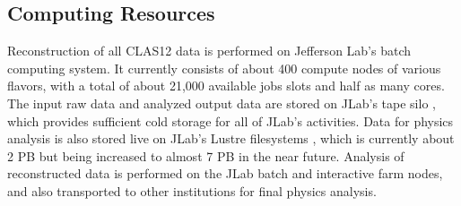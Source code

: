 \subsection{Computing Resources}
Reconstruction of all CLAS12 data is performed on Jefferson Lab's batch computing system\cite{jlab-batch-farm}.  It currently consists of about 400 compute nodes of various flavors, with a total of about 21,000 available jobs slots and half as many cores.  The input raw data and analyzed output data are stored on JLab's tape silo \cite{jlab-tape-silo}, which provides sufficient cold storage for all of JLab's activities.  Data for physics analysis is also stored live on JLab's Lustre filesystems \cite{jlab-lustre}, which is currently about 2 PB but being increased to almost 7 PB in the near future.  Analysis of reconstructed data is performed on the JLab batch and interactive farm nodes, and also transported to other institutions for final physics analysis.

